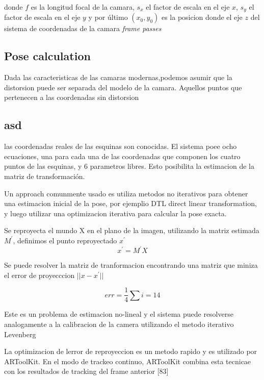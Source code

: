 \documentclass[runningheads]{llncs}
\begin{document}
donde $f$ es la longitud focal de la camara, $s_{x}$ el factor de escala en el eje $x$, $s_{y}$ el factor de escala en el eje $y$ y por último $(x_{0},y_{0})$ es la posicion donde el eje $z$ del sistema de coordenadas de la camara \textit{frame passes}
	
	
	\subsection{Pose calculation}
	
	Dada las caracteristicas de las camaras modernas,podemos asumir que la distorsion puede ser separada del modelo de la camara. Aquellos puntos que pertenecen a las coordenadas sin distorsion %

\subsection{asd}
las coordenadas reales de las esquinas son conocidas. El sistema poee ocho ecuaciones, una para cada una de las coordenadas que componen los cuatro puntos de las esquinas, y 6 parametros libres. Esto posibilita la estimacion de la matriz de transformación.

Un approach comunmente usado es utiliza metodos no iterativos para obtener una estimacion inicial de la pose, por ejemplio DTL direct linear transformation, y luego utilizar una optimizacion iterativa para calcular la pose exacta.

Se reproyecta el mundo X en el plano de la imagen, utilizando la matriz estimada $M^{'}$, definimos el punto reproyectado $x^{'}$
\begin{equation}
x^{'}= M^{'}X
\end{equation}

Se puede resolver la matriz de tranformacion encontrando una matriz que miniza el error de proyecccion $||x - x^{'}||$ 

\begin{equation}
err = \frac{1}{4} \sum {i=1}{4}
\end{equation}

Este es un problema de estimacion no-lineal y el sistema puede resolverse analogamente a la calibracion de la camera utilizando el metodo iterativo Levenberg

La optimizacion de lerror de reproyeccion es un metodo rapido y es utilizado por ARToolKit. En el modo de trackeo continuo, ARToolKit combina esta tecnicae con los resultados de tracking del frame anterior [83]
\end{document}
